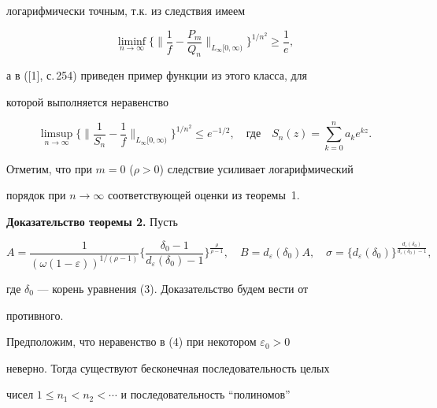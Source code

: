 логарифмически точным, т.к. из следствия имеем 


$$ 


\liminf_{n\to\infty}\bigg\{ 


\bigg\|\frac{1}{f}-\frac{P_m}{Q_n}\bigg\|_{L_\infty[0,\infty)} 


\bigg\}^{1/n^2}\ge\frac{1}{e}, 


$$ 


а в ([1], с.\,254) приведен пример функции из этого класса, для  


которой выполняется неравенство 


$$ 


\limsup_{n\to\infty}\bigg\{ 


\bigg\|\frac{1}{S_n}-\frac{1}{f}\bigg\|_{L_\infty[0,\infty)} 


\bigg\}^{1/n^2}\le e^{-1/2},\quad 


\text{где} 


\quad S_n(z)=\sum^n_{k=0}a_k e^{kz}. 


$$ 


Отметим, что при $m=0$ ($\rho>0$) следствие усиливает логарифмический 


порядок при $n\to\infty$ соответствующей оценки из теоремы~1. 


 


{\bf Доказательство теоремы 2.} Пусть 


\begin{equation} 


A=\frac{1}{(\omega(1-\varepsilon))^{1/(\rho-1)}}\bigg\{ 


\frac{\delta_0-1}{d_\varepsilon(\delta_0)-1} 


\bigg\}^{\frac{\rho}{\rho-1}},\quad 


B=d_\varepsilon(\delta_0)A,\quad 


\sigma=\{d_\varepsilon(\delta_0) 


\}^{\frac{d_\varepsilon(\delta_0)}{d_\varepsilon(\delta_0)-1}}, 


\end{equation}  


где $\delta_0$ --- корень уравнения (3). Доказательство будем вести от 


противного. 


Предположим, что неравенство в (4) при некотором $\varepsilon_0>0$ 


неверно. Тогда существуют бесконечная последовательность целых  


чисел $1\le n_1<n_2<\dotsb$ и последовательность ``полиномов'' 


